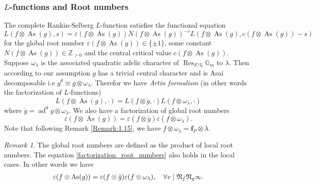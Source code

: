 \documentclass[10pt]{amsart}
\numberwithin{equation}{section}
\theoremstyle{definition}
\theoremstyle{remark} %
\newtheorem{rmk}[thm]{Remark}
\newcommand{\bb}{\mathbb}
\newcommand{\mrm}{\mathrm}
\newcommand{\ad}{\operatorname{ad}}
\renewcommand{\b}{\mathrm{bal}}
\newcommand{\f}{\mathbf{f}}
\newcommand{\Q}{\mathbb{Q}}
\newcommand{\W}{\mathcal{W}}
\newcommand{\Z}{\mathbb{Z}}
\begin{document}
	\subsubsection{$ L $-functions and Root numbers}
	The complete Rankin-Selberg $ L $-function satisfies the functional equation
	\begin{equation}
		\label{fuctional_triple}
		L(f \otimes  \operatorname{As}(g),s) = \varepsilon(f \otimes  \operatorname{As}(g))N(f \otimes  \operatorname{As}(g))^{-s}L(f \otimes  \operatorname{As}(g),c(f \otimes  \operatorname{As}(g))-s)
	\end{equation} 
	for the global root number $ \varepsilon(f \otimes  \operatorname{As}(g)) \in \{\pm1\} $, some constant $ N(f \otimes  \operatorname{As}(g)) \in \Z_{>0} $ and the central critical value $ c(f \otimes  \operatorname{As}(g)) $.
	Suppose $ \omega_\lambda $ is the associated quadratic adelic character of $ \operatorname{Res}_{F/\Q}\bb{G}_m $ to $ \lambda $.	Then according to our assumption $ g $ has a trivial central character and is Asai decomposable i.e $ g^\theta \cong g \otimes \omega_\lambda $. Therefor we have \emph{Artin formalism} (in other words the factorization of $ L $-functions)    
	\begin{equation}
		\label{artin_formalism}
		L(f \otimes  \operatorname{As}(g),\cdot) = L(f \otimes \breve{g} ,\cdot) L(f \otimes \omega_\lambda, \cdot )
	\end{equation}
	where $ \breve{g} = \ad^0 g \otimes \omega_\lambda  $. We also have a factorization of global root numbers
	\begin{equation}
		\label{factorization_root_numbers}
		\varepsilon(f \otimes  \operatorname{As}(g))= \varepsilon(f \otimes \breve{g})\varepsilon(f \otimes \omega_\lambda).
	\end{equation}
	Note that following Remark \ref{Remark:1.15}, we have $ f \otimes \omega_\lambda =\f_P \otimes \lambda $. 
	\begin{rmk}
		The global root numbers are defined as the product of local root numbers. The equation \eqref{factorization_root_numbers} also holds in the local cases. In other words we have
		\begin{align*}
			\varepsilon(f \otimes  \operatorname{As}(g))= \varepsilon(f \otimes \breve{g})\varepsilon(f \otimes \omega_\lambda), \quad \forall v \mid \frak N_f\frak N_g \infty.
		\end{align*}		
	\end{rmk}
\end{document}
